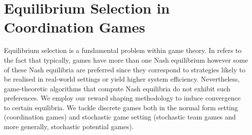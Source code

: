 \documentclass[12pt]{article}
\begin{document}
\section{Equilibrium Selection in Coordination Games}
Equilibrium selection is a fundamental problem within game theory. In refers to the fact that typically, games have more than one Nash equilibrium however some of these Nash equilibria are preferred since they correspond to strategies likely to be realised in real-world settings or yield higher system efficiency. Nevertheless, game-theoretic algorithms that compute Nash equilibria do not exhibit such preferences. We employ our reward shaping methodology to induce convergence to certain equilibria. We tackle discrete games both in the normal form setting (coordination games) and stochastic game setting (stochastic team games and more generally, stochastic potential games).



\printbibliography
\end{document}
